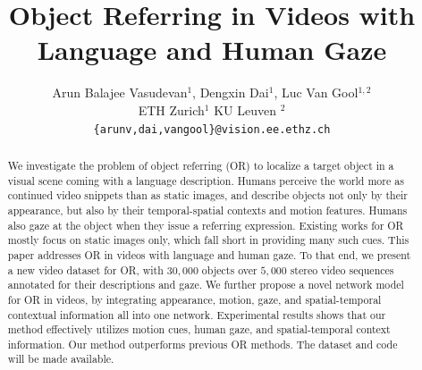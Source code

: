 \documentclass[10pt,twocolumn,letterpaper]{article}
\begin{document}
\title{Object Referring in Videos with Language and Human Gaze}

\author{Arun Balajee Vasudevan$^{1}$, Dengxin Dai$^{1}$, Luc Van Gool$^{1,2}$  \\
ETH Zurich$^{1}$ \hspace{1.5cm} KU Leuven $^{2}$  \\
{\tt\small \{arunv,dai,vangool\}@vision.ee.ethz.ch}
}
\def\AB#1{\color{blue}{#1 }\color{black}} %
\def\DD#1{\color{blue}{#1 }\color{black}} %
\maketitle


\begin{abstract}
We investigate the problem of object referring (OR) \ie to localize a
target object in a visual scene coming with a language
description. Humans perceive the world more as continued video
snippets than as static images, and describe objects not only by their
appearance, but also by their temporal-spatial contexts and motion
features. Humans also gaze at the object when they issue a referring
expression. Existing works for OR mostly focus on static images only,
which fall short in providing many such cues. This paper addresses OR
in videos with language and human gaze. To that end, we present a new
video dataset for OR, with $30,000$ objects over $5,000$ stereo video
sequences annotated for their descriptions and gaze. We further
propose a novel network model for OR in videos, by integrating
appearance, motion, gaze, and spatial-temporal contextual information
all into one network. Experimental results shows that our method
effectively utilizes motion cues, human gaze, and spatial-temporal
context information. Our method outperforms previous OR methods. The
dataset and code will be made available.

\end{abstract}
\end{document}
